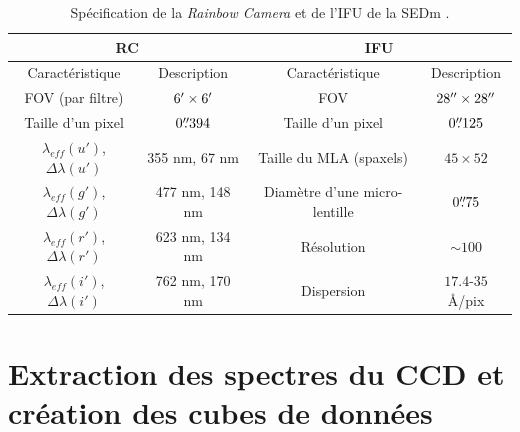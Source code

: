 \documentclass[../main/main.tex]{subfiles}
\begin{document}
\begin{table}[ht]
  \centerfloat
  \renewcommand{\arraystretch}{1.5}
  \begin{threeparttable}
    \caption{Spécification de la \textit{Rainbow Camera} et de l'IFU
      de la SEDm \citep{SEDM18}.}
    \label{tab:sedmspecification}
    \begin{tabular}{cc||cc}
      \toprule
      \multicolumn{2}{c||}{RC} & \multicolumn{2}{c}{IFU} \\
      \midrule
      Caractéristique & Description & Caractéristique & Description\\
      \midrule
      FOV (par filtre) & $6^\prime\times6^\prime$ & FOV &
                                             $28^{\prime\prime}\times28^{\prime\prime}$\\
      Taille d'un pixel & $0\overset{\prime\prime}{.}394$ & Taille d'un pixel &
                                                             $0\overset{\prime\prime}{.}125$\\
      $\lambda_{eff}(u')$, $\Delta\lambda(u')$ & 355 nm, 67 nm & Taille
                                                                du
                                                                MLA (spaxels)
                                    & $45\times52$\\
      $\lambda_{eff}(g')$, $\Delta\lambda(g')$ & 477 nm, 148 nm & Diamètre
                                                                d'une
                                                                micro-lentille&
                                                                          $0\overset{\prime\prime}{.}75$\\
      $\lambda_{eff}(r')$, $\Delta\lambda(r')$ & 623 nm, 134 nm &
                                                                  Résolution
                                    & $\sim100$\\
      
      $\lambda_{eff}(i')$, $\Delta\lambda(i')$ & 762 nm, 170 nm &
                                                                  Dispersion& $17.4$-$35$\AA/pix\\
      \bottomrule
    \end{tabular}
  \end{threeparttable}
\end{table}

  
\section{Extraction des spectres du CCD et création des cubes de données}
\label{sec:pysedmcube}
\end{document}
